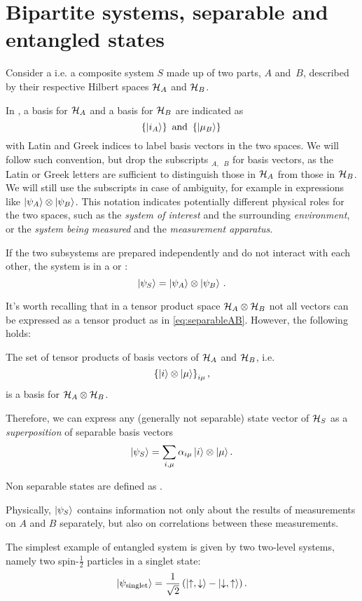 \section{Bipartite systems, separable and entangled states}

Consider a 
i.e. a composite system $S$
made up of two parts, $A$ and~$B$,
described by their respective Hilbert spaces
$\mathcal{H}_A$ and $\mathcal{H}_B$.

In \cite{Haroche_Exploring},
a basis for $\mathcal{H}_A$ and a basis for $\mathcal{H}_B$
are indicated as
$$
  \left\{\ket{i_A}\right\} \text{ and } \left\{\ket{\mu_B}\right\}\,
$$
with Latin and Greek indices to label basis vectors in the two spaces.
We will follow such convention, but drop the subscripts 
${}_{A,}$ ${}_{B}$ for
basis vectors, as the Latin or Greek letters are sufficient to distinguish
those in $\mathcal{H}_A$ from those in $\mathcal{H}_B$. We will still
use the subscripts in case of ambiguity,
for example in expressions
like $\ket{\psi_A}\otimes\ket{\psi_B}$. 
This notation
indicates potentially different physical roles for the two spaces,
such as the \emph{system of interest} and the surrounding \emph{environment},
or the \emph{system being measured} and the \emph{measurement apparatus}.

If the two subsystems are prepared independently and do not interact with each other,
the system is in a  or :
\begin{equation}\label{eq:separableAB}
  \ket{\psi_S} = \ket{\psi_A}\otimes\ket{\psi_B} \,\text{.}
\end{equation}

It's worth recalling that in a tensor product space $\mathcal{H}_A\otimes\mathcal{H}_B$
not all vectors can be expressed as a tensor product as in \eqref{eq:separableAB}.
However, the following holds:

\begin{proposition}\label{TensorBase}
The set of tensor products of basis vectors of $\mathcal{H}_A$ and $\mathcal{H}_B$,
i.e. $$\left\{\ket{i} \otimes \ket{\mu}\right\}_{i\mu},$$
is a basis for $\mathcal{H}_A \otimes \mathcal{H}_B$.
\end{proposition}
Therefore, we can express any
(generally not separable) state vector of $\mathcal{H}_S$
as a \emph{superposition} of separable basis vectors
\begin{equation}\label{eq:bipartite_expansion}
  \ket{\psi_S} = \sum_{i, \mu}\alpha_{i\mu}\ket{i}\otimes\ket{\mu} \text{.}
\end{equation}

\begin{definition}
  Non separable states are defined as .  
\end{definition}

Physically,
$\ket{\psi_S}$ contains information
not only about the results of measurements on $A$ and $B$ separately,
but also on correlations between these measurements.

The simplest example of entangled system is given by two two-level systems,
namely two spin-$\frac{1}{2}$ particles in a singlet state:
\[
  \ket{\psi_{\text{singlet}}} = \frac{1}{\sqrt{2}} \left(\ket{\uparrow, \downarrow} - \ket{\downarrow, \uparrow}\right).
\]
